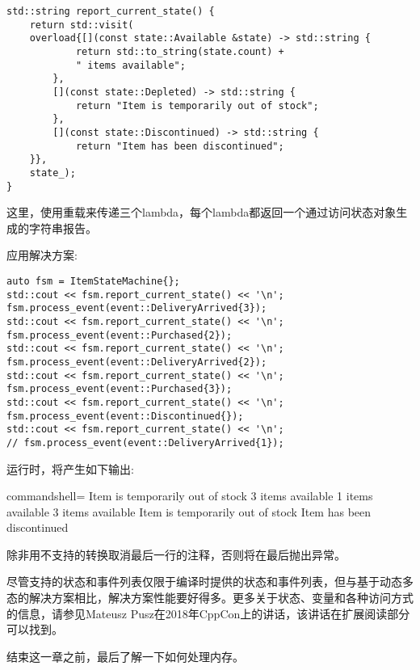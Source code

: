 \begin{lstlisting}[style=styleCXX]
std::string report_current_state() {
	return std::visit(
	overload{[](const state::Available &state) -> std::string {
			return std::to_string(state.count) +
			" items available";
		},
		[](const state::Depleted) -> std::string {
			return "Item is temporarily out of stock";
		},
		[](const state::Discontinued) -> std::string {
			return "Item has been discontinued";
	}},
	state_);
}
\end{lstlisting}

这里，使用重载来传递三个lambda，每个lambda都返回一个通过访问状态对象生成的字符串报告。

应用解决方案:

\begin{lstlisting}[style=styleCXX]
auto fsm = ItemStateMachine{};
std::cout << fsm.report_current_state() << '\n';
fsm.process_event(event::DeliveryArrived{3});
std::cout << fsm.report_current_state() << '\n';
fsm.process_event(event::Purchased{2});
std::cout << fsm.report_current_state() << '\n';
fsm.process_event(event::DeliveryArrived{2});
std::cout << fsm.report_current_state() << '\n';
fsm.process_event(event::Purchased{3});
std::cout << fsm.report_current_state() << '\n';
fsm.process_event(event::Discontinued{});
std::cout << fsm.report_current_state() << '\n';
// fsm.process_event(event::DeliveryArrived{1});
\end{lstlisting}

运行时，将产生如下输出:

\begin{tcblisting}{commandshell={}}
Item is temporarily out of stock
3 items available
1 items available
3 items available
Item is temporarily out of stock
Item has been discontinued
\end{tcblisting}

除非用不支持的转换取消最后一行的注释，否则将在最后抛出异常。

尽管支持的状态和事件列表仅限于编译时提供的状态和事件列表，但与基于动态多态的解决方案相比，解决方案性能要好得多。更多关于状态、变量和各种访问方式的信息，请参见Mateusz Pusz在2018年CppCon上的讲话，该讲话在扩展阅读部分可以找到。

结束这一章之前，最后了解一下如何处理内存。
